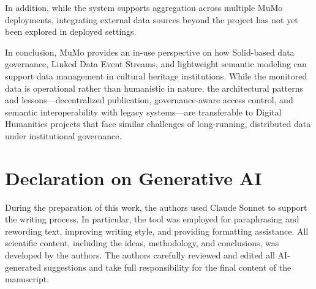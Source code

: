 \documentclass{ceurart}
\begin{document}
In addition, while the system supports aggregation across multiple MuMo
deployments, integrating external data sources beyond the project has
not yet been explored in deployed settings.

In conclusion, MuMo provides an in-use perspective on how Solid-based
data governance, Linked Data Event Streams, and lightweight semantic
modeling can support data management in cultural heritage institutions.
While the monitored data is operational rather than humanistic in
nature, the architectural patterns and lessons---decentralized
publication, governance-aware access control, and semantic
interoperability with legacy systems---are transferable to Digital
Humanities projects that face similar challenges of long-running,
distributed data under institutional governance.

\section*{Declaration on Generative AI}

During the preparation of this work, the authors used Claude Sonnet to
support the writing process. In particular, the tool was employed for
paraphrasing and rewording text, improving writing style, and providing
formatting assistance. All scientific content, including the ideas,
methodology, and conclusions, was developed by the authors. The authors
carefully reviewed and edited all AI-generated suggestions and take full
responsibility for the final content of the manuscript.




\end{document}
